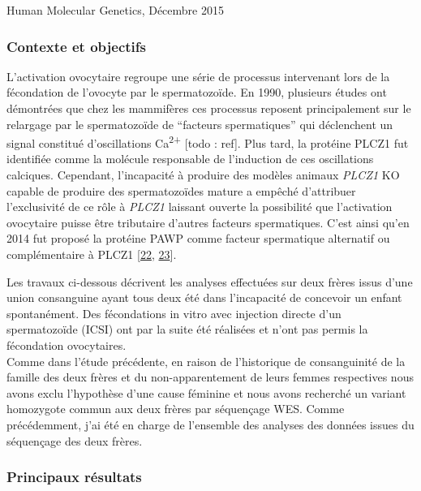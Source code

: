\documentclass[12pt,twoside]{ugathesis}
\begin{document}
Human Molecular Genetics, Décembre 2015

\newpage

\subsubsection{Contexte et objectifs}\label{contexte-et-objectifs-1}

L'activation ovocytaire regroupe une série de processus intervenant lors
de la fécondation de l'ovocyte par le spermatozoïde. En 1990, plusieurs
études ont démontrées que chez les mammifères ces processus reposent
principalement sur le relargage par le spermatozoïde de ``facteurs
spermatiques'' qui déclenchent un signal constitué d'oscillations
Ca\textsuperscript{2+} {[}todo : ref{]}. Plus tard, la protéine PLCZ1
fut identifiée comme la molécule responsable de l'induction de ces
oscillations calciques. Cependant, l'incapacité à produire des modèles
animaux \emph{PLCZ1} KO capable de produire des spermatozoïdes mature a
empêché d'attribuer l'exclusivité de ce rôle à \emph{PLCZ1} laissant
ouverte la possibilité que l'activation ovocytaire puisse être
tributaire d'autres facteurs spermatiques. C'est ainsi qu'en 2014 fut
proposé la protéine PAWP comme facteur spermatique alternatif ou
complémentaire à PLCZ1 {[}\protect\hyperlink{ref-Aarabi2014}{22},
\protect\hyperlink{ref-Aarabi2014a}{23}{]}.

Les travaux ci-dessous décrivent les analyses effectuées sur deux frères
issus d'une union consanguine ayant tous deux été dans l'incapacité de
concevoir un enfant spontanément. Des fécondations in vitro avec
injection directe d'un spermatozoïde (ICSI) ont par la suite été
réalisées et n'ont pas permis la fécondation ovocytaires.\\
Comme dans l'étude précédente, en raison de l'historique de
consanguinité de la famille des deux frères et du non-apparentement de
leurs femmes respectives nous avons exclu l'hypothèse d'une cause
féminine et nous avons recherché un variant homozygote commun aux deux
frères par séquençage WES. Comme précédemment, j'ai été en charge de
l'ensemble des analyses des données issues du séquençage des deux
frères.

\newpage



\newpage

\subsubsection{Principaux résultats}\label{principaux-resultats-1}
\end{document}

